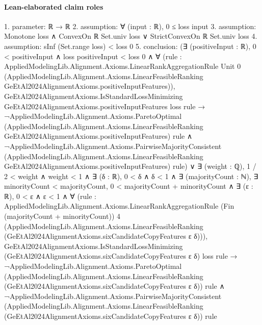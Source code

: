 \documentclass[10pt]{article}
\begin{document}
\paragraph{Lean-elaborated claim roles}\begin{ReviewVerbatim}
1. parameter: ℝ → ℝ
2. assumption: ∀ (input : ℝ), 0 ≤ loss input
3. assumption: Monotone loss ∧ ConvexOn ℝ Set.univ loss ∨ StrictConvexOn ℝ Set.univ loss
4. assumption: sInf (Set.range loss) < loss 0
5. conclusion: (∃ (positiveInput : ℝ),
    0 < positiveInput ∧
      loss positiveInput < loss 0 ∧
        ∀
          (rule :
            AppliedModelingLib.Alignment.Axioms.LinearRankAggregationRule Unit 0
              (AppliedModelingLib.Alignment.Axioms.LinearFeasibleRanking
                GeEtAl2024AlignmentAxioms.positiveInputFeatures)),
          GeEtAl2024AlignmentAxioms.IsStandardLossMinimizing GeEtAl2024AlignmentAxioms.positiveInputFeatures loss rule →
            ¬AppliedModelingLib.Alignment.Axioms.ParetoOptimal
                  (AppliedModelingLib.Alignment.Axioms.LinearFeasibleRanking
                    GeEtAl2024AlignmentAxioms.positiveInputFeatures)
                  rule ∧
              ¬AppliedModelingLib.Alignment.Axioms.PairwiseMajorityConsistent
                  (AppliedModelingLib.Alignment.Axioms.LinearFeasibleRanking
                    GeEtAl2024AlignmentAxioms.positiveInputFeatures)
                  rule) ∨
  ∃ (weight : ℚ),
    1 / 2 < weight ∧
      weight < 1 ∧
        ∃ (δ : ℝ),
          0 < δ ∧
            δ < 1 ∧
              ∃ (majorityCount : ℕ),
                ∃ minorityCount < majorityCount,
                  0 < majorityCount + minorityCount ∧
                    ∃ (ε : ℝ),
                      0 < ε ∧
                        ε < 1 ∧
                          ∀
                            (rule :
                              AppliedModelingLib.Alignment.Axioms.LinearRankAggregationRule
                                (Fin (majorityCount + minorityCount)) 4
                                (AppliedModelingLib.Alignment.Axioms.LinearFeasibleRanking
                                  (GeEtAl2024AlignmentAxioms.sixCandidateCopyFeatures ε δ))),
                            GeEtAl2024AlignmentAxioms.IsStandardLossMinimizing
                                (GeEtAl2024AlignmentAxioms.sixCandidateCopyFeatures ε δ) loss rule →
                              ¬AppliedModelingLib.Alignment.Axioms.ParetoOptimal
                                    (AppliedModelingLib.Alignment.Axioms.LinearFeasibleRanking
                                      (GeEtAl2024AlignmentAxioms.sixCandidateCopyFeatures ε δ))
                                    rule ∧
                                ¬AppliedModelingLib.Alignment.Axioms.PairwiseMajorityConsistent
                                    (AppliedModelingLib.Alignment.Axioms.LinearFeasibleRanking
                                      (GeEtAl2024AlignmentAxioms.sixCandidateCopyFeatures ε δ))
                                    rule
\end{ReviewVerbatim}
\end{document}
